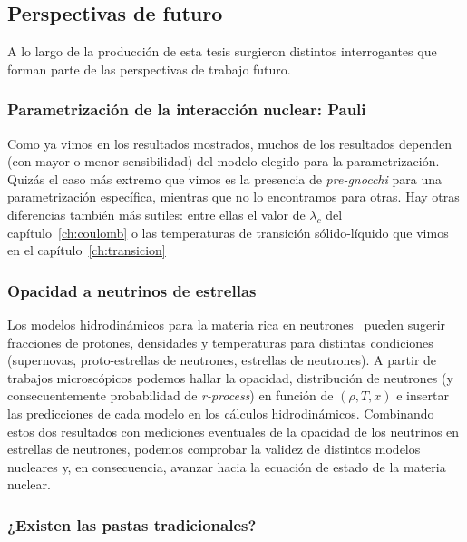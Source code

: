 \subsection{Perspectivas de futuro}

A lo largo de la producción de esta tesis surgieron distintos interrogantes que forman parte de las perspectivas de trabajo futuro.

\subsubsection{Parametrización de la interacción nuclear: Pauli}

Como ya vimos en los resultados mostrados, muchos de los resultados dependen (con mayor o menor sensibilidad) del modelo elegido para la parametrización.
Quizás el caso más extremo que vimos es la presencia de \emph{pre-gnocchi} para una parametrización específica, mientras que no lo encontramos para otras.
Hay otras diferencias también más sutiles: entre ellas el valor de $\lambda_c$ del capítulo~\ref{ch:coulomb} o las temperaturas de transición sólido-líquido que vimos en el capítulo~\ref{ch:transicion}


\subsubsection{Opacidad a neutrinos de estrellas}

Los modelos hidrodinámicos para la materia rica en neutrones~\cite{ruffert_coalescing_1995, mezzacappa_investigation_1998, geppert_temperature_2004, woosley_physics_2005, liebendorfer_supernova_2005} pueden sugerir fracciones de protones, densidades y temperaturas para distintas condiciones (supernovas, proto-estrellas de neutrones, estrellas de neutrones).
A partir de trabajos microscópicos podemos hallar la opacidad, distribución de neutrones (y consecuentemente probabilidad de \emph{r-process}) en función de $(\rho, T, x)$ e insertar las predicciones de cada modelo en los cálculos hidrodinámicos.
Combinando estos dos resultados con mediciones eventuales de la opacidad de los neutrinos en estrellas de neutrones, podemos comprobar la validez de distintos modelos nucleares y, en consecuencia, avanzar hacia la ecuación de estado de la materia nuclear.

\subsubsection{¿Existen las pastas tradicionales?}
